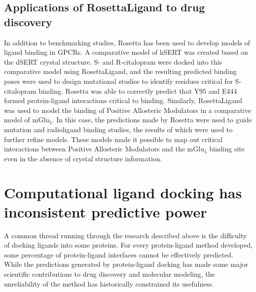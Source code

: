 \subsection{Applications of RosettaLigand to drug discovery}
In addition to benchmarking studies, Rosetta has been used to develop models of ligand binding in GPCRs.
A comparative model of hSERT was created based on the dSERT crystal structure. 
S- and R-citalopram were docked into this comparative model using RosettaLigand, and the resulting predicted binding poses were used to design mutational studies to identify residues critical for S-citalopram binding.
Rosetta was able to correctly predict that Y95 and E444 formed protein-ligand interactions critical to binding\citep{Combs:2011db}.  
Similarly, RosettaLigand was used to model the binding of Positive Allosteric Modulators in a comparative model of mGlu$_{5}$\citep{Turlington:2013et}.
In this case, the predictions made by Rosetta were used to guide mutation and radioligand binding studies, the results of which were used to further refine models.
These models made it possible to map out critical interactions between Positive Allosteric Modulators and the mGlu$_{5}$ binding site even in the absence of crystal structure information.

\section{Computational ligand docking has inconsistent predictive power} 

A common thread running through the research described above is the difficulty of docking ligands into some proteins.
For every protein-ligand method developed, some percentage of protein-ligand interfaces cannot be effectively predicted.
While the predictions generated by protein-ligand docking has made some major scientific contributions to drug discovery and molecular modeling, the unreliability of the method has historically constrained its usefulness.

